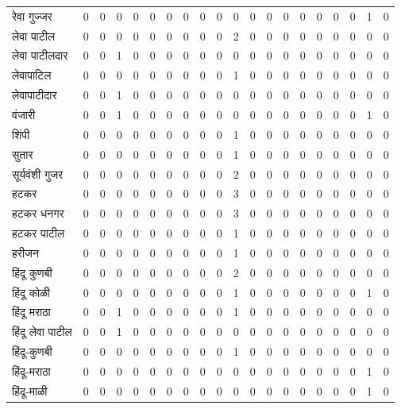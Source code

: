 \documentclass{article}
\begin{document}
\begin{table}
\begin{tabular}{lrrrrrrrrrrrrrrrrrrr}
रेवा गुज्जर & 0 & 0 & 0 & 0 & 0 & 0 & 0 & 0 & 0 & 0 & 0 & 0 & 0 & 0 & 0 & 0 & 0 & 1 & 0 \\
लेवा पाटील & 0 & 0 & 0 & 0 & 0 & 0 & 0 & 0 & 0 & 2 & 0 & 0 & 0 & 0 & 0 & 0 & 0 & 0 & 0 \\
लेवा पाटीलदार & 0 & 0 & 1 & 0 & 0 & 0 & 0 & 0 & 0 & 0 & 0 & 0 & 0 & 0 & 0 & 0 & 0 & 0 & 0 \\
लेवापाटिल & 0 & 0 & 0 & 0 & 0 & 0 & 0 & 0 & 0 & 1 & 0 & 0 & 0 & 0 & 0 & 0 & 0 & 0 & 0 \\
लेवापाटीदार & 0 & 0 & 1 & 0 & 0 & 0 & 0 & 0 & 0 & 0 & 0 & 0 & 0 & 0 & 0 & 0 & 0 & 0 & 0 \\
वंजारी & 0 & 0 & 1 & 0 & 0 & 0 & 0 & 0 & 0 & 0 & 0 & 0 & 0 & 0 & 0 & 0 & 0 & 1 & 0 \\
शिंपी & 0 & 0 & 0 & 0 & 0 & 0 & 0 & 0 & 0 & 1 & 0 & 0 & 0 & 0 & 0 & 0 & 0 & 0 & 0 \\
सुतार & 0 & 0 & 0 & 0 & 0 & 0 & 0 & 0 & 0 & 1 & 0 & 0 & 0 & 0 & 0 & 0 & 0 & 0 & 0 \\
सूर्यवंशी गुजर & 0 & 0 & 0 & 0 & 0 & 0 & 0 & 0 & 0 & 2 & 0 & 0 & 0 & 0 & 0 & 0 & 0 & 0 & 0 \\
हटकर & 0 & 0 & 0 & 0 & 0 & 0 & 0 & 0 & 0 & 3 & 0 & 0 & 0 & 0 & 0 & 0 & 0 & 0 & 0 \\
हटकर धनगर & 0 & 0 & 0 & 0 & 0 & 0 & 0 & 0 & 0 & 3 & 0 & 0 & 0 & 0 & 0 & 0 & 0 & 0 & 0 \\
हटकर पाटील & 0 & 0 & 0 & 0 & 0 & 0 & 0 & 0 & 0 & 1 & 0 & 0 & 0 & 0 & 0 & 0 & 0 & 0 & 0 \\
हरीजन & 0 & 0 & 0 & 0 & 0 & 0 & 0 & 0 & 0 & 1 & 0 & 0 & 0 & 0 & 0 & 0 & 0 & 0 & 0 \\
हिंदू कुणबी & 0 & 0 & 0 & 0 & 0 & 0 & 0 & 0 & 0 & 2 & 0 & 0 & 0 & 0 & 0 & 0 & 0 & 0 & 0 \\
हिंदू कोळी & 0 & 0 & 0 & 0 & 0 & 0 & 0 & 0 & 0 & 1 & 0 & 0 & 0 & 0 & 0 & 0 & 0 & 1 & 0 \\
हिंदू मराठा & 0 & 0 & 1 & 0 & 0 & 0 & 0 & 0 & 0 & 1 & 0 & 0 & 0 & 0 & 0 & 0 & 0 & 0 & 0 \\
हिंदू लेवा पाटील & 0 & 0 & 1 & 0 & 0 & 0 & 0 & 0 & 0 & 0 & 0 & 0 & 0 & 0 & 0 & 0 & 0 & 0 & 0 \\
हिंदू-कुणबी & 0 & 0 & 0 & 0 & 0 & 0 & 0 & 0 & 0 & 1 & 0 & 0 & 0 & 0 & 0 & 0 & 0 & 0 & 0 \\
हिंदू-मराठा & 0 & 0 & 0 & 0 & 0 & 0 & 0 & 0 & 0 & 0 & 0 & 0 & 0 & 0 & 0 & 0 & 0 & 1 & 0 \\
हिंदू-माळी & 0 & 0 & 0 & 0 & 0 & 0 & 0 & 0 & 0 & 0 & 0 & 0 & 0 & 0 & 0 & 0 & 0 & 1 & 0 \\
\bottomrule
\end{tabular}
\end{table}
\end{document}
